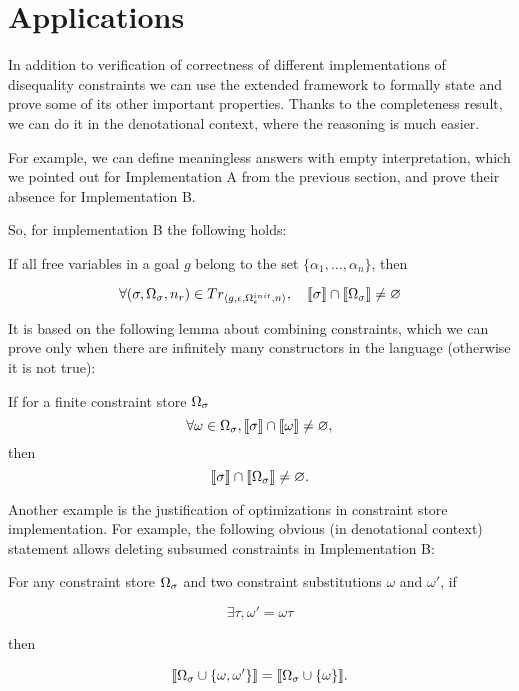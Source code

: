 \section{Applications}

In addition to verification of correctness of different implementations of disequality constraints we can use the extended framework to formally
state and prove some of its other important properties. Thanks to the completeness result, we can do it in the denotational context,
where the reasoning is much easier.

For example, we can define meaningless answers with empty interpretation, which we pointed out for Implementation A from the previous section,
and prove their absence for Implementation B.

So, for implementation B the following holds:

\begin{lemma}
If all free variables in a goal $g$ belong to the set $\{\alpha_1,\dots,\alpha_n\}$, then

\[ \forall (\sigma, \Omega_\sigma, n_r) \in Tr_{\left<{g, \epsilon, \Omega_\epsilon^{init}, n}\right>}, \quad \llbracket{\sigma}\rrbracket \cap \llbracket{\Omega_\sigma}\rrbracket \neq \varnothing \]
\end{lemma}

It is based on the following lemma about combining constraints, which we can prove only when there are infinitely many constructors in the language (otherwise it is not true):

\begin{lemma}
If for a finite constraint store $\Omega_\sigma$
\[ \forall \omega \in \Omega_\sigma,  \llbracket{\sigma}\rrbracket \cap \llbracket{\omega}\rrbracket \neq \varnothing, \]
then
\[ \llbracket{\sigma}\rrbracket \cap \llbracket{\Omega_\sigma}\rrbracket \neq \varnothing. \]
\end{lemma}

Another example is the justification of optimizations in constraint store implementation. For example, the following obvious (in denotational context) statement
allows deleting subsumed constraints in Implementation B:

\begin{lemma}
For any constraint store $\Omega_\sigma$ and two constraint substitutions $\omega$ and $\omega'$, if

\[ \exists \tau, \omega' = \omega \tau \]

then

\[ \llbracket{\Omega_\sigma \cup \{\omega, \omega'\}}\rrbracket = \llbracket{\Omega_\sigma \cup \{\omega\}}\rrbracket. \]
\end{lemma}
